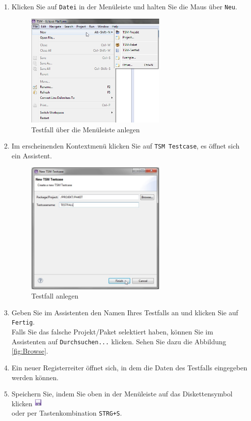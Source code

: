 \documentclass[11pt,a4paper,titlepage]{article}
\begin{document}
\begin{enumerate}
\item Klicken Sie auf \texttt{Datei} in der Menüleiste und halten Sie die Maus über \texttt{Neu}.

\begin{figure}[H]
\centering
\includegraphics[width= 260px]{BilderHandbuch/AnlegenM.png}
\caption{Testfall über die Menüleiste anlegen}
\label{fig:AnlegenM}
\end{figure}

\item Im erscheinenden Kontextmenü klicken Sie auf \texttt{TSM Testcase}, es öffnet sich ein Assistent.

\begin{figure}[H]
\centering
\includegraphics[width= 260px]{BilderHandbuch/Testfall/NewTestcase.png}
\caption{Testfall anlegen}
\label{fig:NewTestcase}
\end{figure}

\item Geben Sie im Assistenten den Namen Ihres Testfalls an und klicken Sie auf \texttt{Fertig}.\\
Falls Sie das falsche Projekt/Paket selektiert haben, können Sie im Assistenten auf \texttt{Durchsuchen...} klicken. Sehen Sie dazu die Abbildung \ref{fig:Browse}.
\item Ein neuer Registerreiter öffnet sich, in dem die Daten des Testfalls eingegeben werden können.
\item Speichern Sie, indem Sie oben in der Menüleiste auf das
Diskettensymbol klicken
\includegraphics[width= 15px]{BilderHandbuch/Testfall/Disk.png}
\\ oder per Tastenkombination \texttt{STRG+S}.

\end{enumerate}
\end{document}
